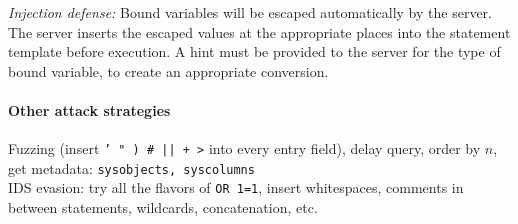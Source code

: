 \textit{Injection defense:} Bound variables will be escaped automatically by the server. The server inserts the escaped values at the appropriate places into the statement template before execution. A hint must be provided to the server for the type of bound variable, to create an appropriate conversion.

\paragraph{Other attack strategies} Fuzzing (insert {\tt ' " ) \# || + >} into every entry field), delay query, order by $n$, get metadata: {\tt sysobjects, syscolumns} \\
IDS evasion: try all the flavors of {\tt OR 1=1}, insert whitespaces, comments in between statements, wildcards, concatenation, etc.

